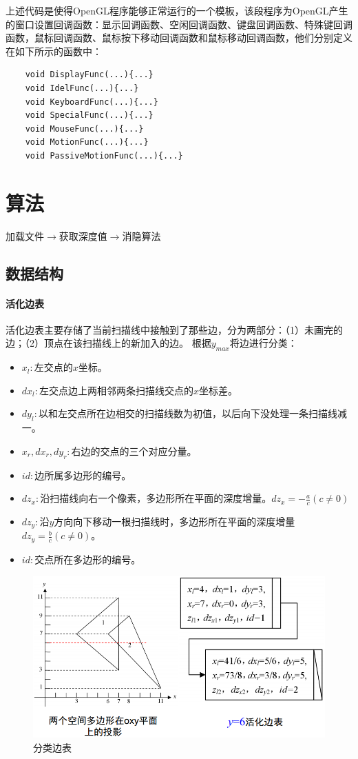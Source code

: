 \documentclass[10pt]{article}
\begin{document}
上述代码是使得OpenGL程序能够正常运行的一个模板，该段程序为OpenGL产生的窗口设置回调函数：显示回调函数、空闲回调函数、键盘回调函数、特殊键回调函数，鼠标回调函数、鼠标按下移动回调函数和鼠标移动回调函数，他们分别定义在如下所示的函数中：
\begin{lstlisting}
	void DisplayFunc(...){...}
	void IdelFunc(...){...}
	void KeyboardFunc(...){...}
	void SpecialFunc(...){...}
	void MouseFunc(...){...}
	void MotionFunc(...){...}
	void PassiveMotionFunc(...){...}
\end{lstlisting}


\section{算法}
加载文件$\to$获取深度值$\to$消隐算法
\subsection{数据结构}
\paragraph{活化边表}
活化边表主要存储了当前扫描线中接触到了那些边，分为两部分：（1）未画完的边；（2）顶点在该扫描线上的新加入的边。
根据$y_{max}$将边进行分类：
\begin{itemize}
\item{$x_l:$左交点的$x$坐标。}
\item{$dx_l:$左交点边上两相邻两条扫描线交点的$x$坐标差。}
\item{$dy_l:$以和左交点所在边相交的扫描线数为初值，以后向下没处理一条扫描线减一。}
\item{$x_r,dx_r,dy_r:$右边的交点的三个对应分量。}
\item{$id:$边所属多边形的编号。}
\item{$dz_x:$沿扫描线向右一个像素，多边形所在平面的深度增量。$dz_x=-\frac{a}{c}(c \neq 0)$}
\item{$dz_y:$沿$y$方向向下移动一根扫描线时，多边形所在平面的深度增量$dz_y=\frac{b}{c}(c \neq 0)$。}
\item{$id:$交点所在多边形的编号。}
\end{itemize}
\begin{figure}[H]
\setlength{\abovecaptionskip}{2pt}
\begin{center}
\includegraphics[scale=0.4]{structure2.png}
\end{center}
\caption{分类边表}
\end{figure}
\end{document}
